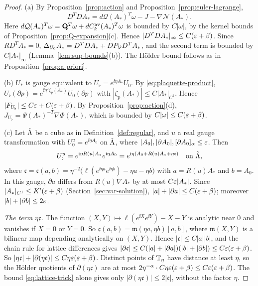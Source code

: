 \begin{proof}
(a) By Proposition~\ref{prop:action} and Proposition~\ref{prop:euler-lagrange},
\[
D^TDA_*=d\mathcal Q(A_*)^T\omega-J-\nabla\mathcal N(A_*).
\]
Here $d\mathcal Q(A_*)^T\omega=\mathbf Q^T\omega+dC^{\rm av}_k(A_*)^T\omega$ is bounded by $C|\omega|$, by the kernel bounds of Proposition~\ref{prop:Q-expansion}(c). Hence $|D^TDA_*|_\infty\le C(\varepsilon+\beta)$. Since $RD^TA_*=0$, $\Delta_{U_0}A_*=D^TDA_*+DP_\mathcal V D^TA_*$, and the second term is bounded by $C|A_*|_\infty$ (Lemma~\ref{lem:sup-bounds}(b)). The H\"older bound follows as in Proposition~\ref{prop:a-priori}.

(b) $U_*$ is gauge equivalent to $U_\flat=e^{\ii\eta A_*}U_0$. By \eqref{eq:plaquette-product}, $U_\flat(\partial p)=e^{\ii\eta^2\zeta_p(A_*)}U_0(\partial p)$ with $|\zeta_p(A_*)|\le C|A_*|_{C^1}$. Hence $|F_{U_\flat}|\le C\varepsilon+C(\varepsilon+\beta)$. By Proposition~\ref{prop:action}(d), $J_{U_\flat}=\Psi(A_*)^{-T}\nabla\Phi(A_*)$, which is bounded by $C|\omega|\le C(\varepsilon+\beta)$.

(c) Let $\hat{\Lambda}$ be a cube as in Definition~\ref{def:regular}, and $u$ a real gauge transformation with $U_0^u=e^{\ii\eta A_0}$ on $\hat{\Lambda}$, where $|A_0|,|\partial A_0|,[\partial A_0]_\alpha\le\varepsilon$. Then
\[
U_\flat^u=e^{\mathrm i\eta R(u)A_*}e^{\mathrm i\eta A_0}=e^{\mathrm i\eta(A_0+R(u)A_*+\eta\mathfrak c)}\quad\text{on }\hat{\Lambda},
\]
where $\mathfrak c=\mathfrak c(a,b)=\eta^{-2}\big(\ell(e^{\ii\eta a}e^{\ii\eta b})-\eta a-\eta b\big)$ with $a=R(u)A_*$ and $b=A_0$. In this gauge, $\partial a$ differs from $R(u)\nabla A_*$ by at most $C\varepsilon|A_*|$. Since $|A_*|_{C^1}\le K'(\varepsilon+\beta)$ (Section~\ref{sec:var-solution}), $|a|+|\partial a|\le C(\varepsilon+\beta)$; moreover $|b|+|\partial b|\le2\varepsilon$.

\emph{The term $\eta\mathfrak c$.} The function $(X,Y)\mapsto\ell(e^{\ii X}e^{\ii Y})-X-Y$ is analytic near $0$ and vanishes if $X=0$ or $Y=0$. So $\mathfrak c(a,b)=\mathfrak m(\eta a,\eta b)[a,b]$, where $\mathfrak m(X,Y)$ is a bilinear map depending analytically on $(X,Y)$. Hence $|\mathfrak c|\le C|a||b|$, and the chain rule for lattice differences gives $|\partial\mathfrak c|\le C(|a|+|\partial a|)(|b|+|\partial b|)\le C\varepsilon(\varepsilon+\beta)$. So $|\eta\mathfrak c|+|\partial(\eta\mathfrak c)|\le C\eta\varepsilon(\varepsilon+\beta)$. Distinct points of $\mathbb T_\eta$ have distance at least $\eta$, so the H\"older quotients of $\partial(\eta\mathfrak c)$ are at most $2\eta^{-\alpha}\cdot C\eta\varepsilon(\varepsilon+\beta)\le C\varepsilon(\varepsilon+\beta)$. The bound \eqref{eq:lattice-trick} alone gives only $|\partial(\eta\mathfrak c)|\le2|\mathfrak c|$, without the factor $\eta$.


\end{proof}
